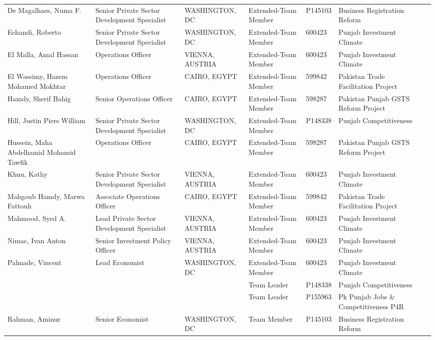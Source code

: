 \documentclass{article}\usepackage[]{graphicx}\usepackage[]{color}
\begin{document}
\begin{minipage}[b]{0.99\textwidth}
{\begin{longtable}{>{\raggedright}p{1.4in}>{\raggedright}p{1in}>{\raggedright}p{1in}>{\raggedright}p{1in}l>{\raggedright}p{1.5in}l}
  De Magalhaes, Numa F. & Senior Private Sector Development Specialist & WASHINGTON, DC & Extended-Team Member & P145103 & Business Registration Reform &  \\ 
  Echandi, Roberto & Senior Private Sector Development Specialist & WASHINGTON, DC & Extended-Team Member & 600423 & Punjab Investment Climate &  \\ 
  El Malla, Amal Hassan & Operations Officer & VIENNA, AUSTRIA & Extended-Team Member & 600423 & Punjab Investment Climate &  \\ 
  El Wassimy, Hazem Mohamed Mokhtar & Operations Officer & CAIRO, EGYPT & Extended-Team Member & 599842 & Pakistan Trade Facilitation Project &  \\ 
  Hamdy, Sherif Bahig & Senior Operations Officer & CAIRO, EGYPT & Extended-Team Member & 598287 & Pakistan Punjab GSTS Reform Project &  \\ 
  Hill, Justin Piers William & Senior Private Sector Development Specialist & WASHINGTON, DC & Extended-Team Member & P148338 & Punjab Competitiveness &  \\ 
  Hussein, Maha Abdelhamid Mohamid Tawfik & Operations Officer & CAIRO, EGYPT & Extended-Team Member & 598287 & Pakistan Punjab GSTS Reform Project &  \\ 
  Khuu, Kathy & Senior Private Sector Development Specialist & VIENNA, AUSTRIA & Extended-Team Member & 600423 & Punjab Investment Climate &  \\ 
  Mahgoub Hamdy, Marwa Fattouh & Associate Operations Officer & CAIRO, EGYPT & Extended-Team Member & 599842 & Pakistan Trade Facilitation Project &  \\ 
  Mahmood, Syed A. & Lead Private Sector Development Specialist & VIENNA, AUSTRIA & Extended-Team Member & 600423 & Punjab Investment Climate &  \\ 
  Nimac, Ivan Anton & Senior Investment  Policy Officer & VIENNA, AUSTRIA & Extended-Team Member & 600423 & Punjab Investment Climate &  \\ 
  Palmade, Vincent & Lead Economist & WASHINGTON, DC & Extended-Team Member & 600423 & Punjab Investment Climate &  \\ 
   &  &  & Team Leader & P148338 & Punjab Competitiveness &  \\ 
   &  &  & Team Leader & P155963 & Pk Punjab Jobs \& Competitiveness P4R &  \\ 
  Rahman, Aminur & Senior Economist & WASHINGTON, DC & Team Member & P145103 & Business Registration Reform &  \\ 

\end{longtable}}
\end{minipage}
\end{document}
